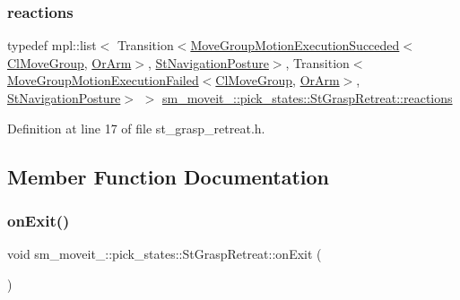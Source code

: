 \subsubsection{\texorpdfstring{reactions}{reactions}}
{\footnotesize\ttfamily typedef mpl\+::list$<$ Transition$<$\hyperlink{structmoveit__z__client_1_1MoveGroupMotionExecutionSucceded}{Move\+Group\+Motion\+Execution\+Succeded}$<$\hyperlink{classmoveit__z__client_1_1ClMoveGroup}{Cl\+Move\+Group}, \hyperlink{classsm__moveit__4_1_1OrArm}{Or\+Arm}$>$, \hyperlink{structsm__moveit__4_1_1pick__states_1_1StNavigationPosture}{St\+Navigation\+Posture}$>$, Transition$<$\hyperlink{structmoveit__z__client_1_1MoveGroupMotionExecutionFailed}{Move\+Group\+Motion\+Execution\+Failed}$<$\hyperlink{classmoveit__z__client_1_1ClMoveGroup}{Cl\+Move\+Group}, \hyperlink{classsm__moveit__4_1_1OrArm}{Or\+Arm}$>$, \hyperlink{structsm__moveit__4_1_1pick__states_1_1StNavigationPosture}{St\+Navigation\+Posture}$>$ $>$ \hyperlink{structsm__moveit__4_1_1pick__states_1_1StGraspRetreat_aad4cc2d348387279c746f628b8f6da38}{sm\+\_\+moveit\+\_\+::pick\+\_\+states\+::\+St\+Grasp\+Retreat\+::reactions}}



Definition at line 17 of file st\+\_\+grasp\+\_\+retreat.\+h.



\subsection{Member Function Documentation}
\mbox{\label{structsm__moveit__4_1_1pick__states_1_1StGraspRetreat_aba04f694c6c7c664a0c6a6e10c8ce0f1}} 
\subsubsection{\texorpdfstring{on\+Exit()}{onExit()}}
{\footnotesize\ttfamily void sm\+\_\+moveit\+\_\+::pick\+\_\+states\+::\+St\+Grasp\+Retreat\+::on\+Exit (\begin{DoxyParamCaption}{ }\end{DoxyParamCaption})\hspace{0.3cm}{\ttfamily [inline]}}



